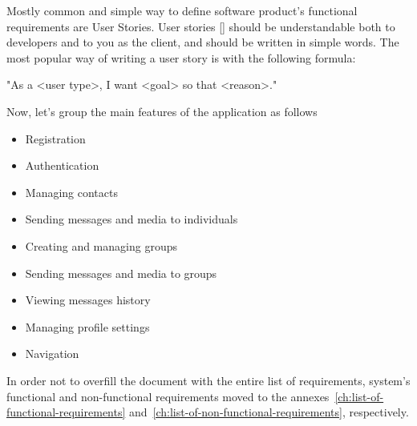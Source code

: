 Mostly common and simple way to define software product's functional requirements are User Stories.
User stories [\cite{cohn2004user}] should be understandable both to developers and to you as the client, and should be written in simple words.
The most popular way of writing a user story is with the following formula:

\begin{center}
    \begin{spverbatim}
        "As a <user type>, I want <goal> so that <reason>."
    \end{spverbatim}
\end{center}

Now, let's group the main features of the application as follows

\begin{itemize}
    \item Registration
    \item Authentication
    \item Managing contacts
    \item Sending messages and media to individuals
    \item Creating and managing groups
    \item Sending messages and media to groups
    \item Viewing messages history
    \item Managing profile settings
    \item Navigation
\end{itemize}

In order not to overfill the document with the entire list of requirements, system's functional and non-functional
requirements moved to the annexes~\ref{ch:list-of-functional-requirements} and~\ref{ch:list-of-non-functional-requirements},
respectively.